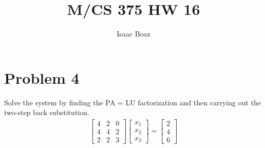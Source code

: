 \documentclass{article}
\title{\vspace{-5ex}M/CS 375 HW 16}
\author{Isaac Boaz}
\begin{document}
\maketitle

\section*{Problem 4}
Solve the system by finding the PA = LU factorization and then carrying out the two-step back substitution.
\begin{align*}
    \begin{bmatrix}
        4 & 2 & 0 \\
        4& 4 & 2 \\
        2 & 2 & 3
    \end{bmatrix}
    \begin{bmatrix}
        x_1 \\
        x_2 \\
        x_3
    \end{bmatrix}
    = 
    \begin{bmatrix}
        2 \\
        4 \\
        6
    \end{bmatrix}
\end{align*}
\end{document}
